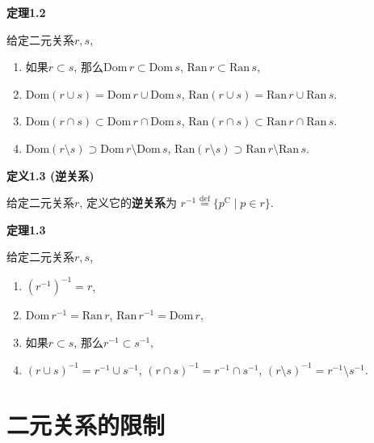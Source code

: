 \vspace{10pt}

\hypertarget{sec:定理1.2}{}
\noindent\textbf{定理1.2}

给定二元关系$r,s$,
\begin{enumerate}
    \item 如果$r\subset s$, 那么$\mathrm{Dom}\,r\subset\mathrm{Dom}\,s$,
    $\mathrm{Ran}\,r\subset\mathrm{Ran}\,s$,
    \item $\mathrm{Dom}(r\cup s)=\mathrm{Dom}\,r\cup\mathrm{Dom}\,s$,
    $\mathrm{Ran}(r\cup s)=\mathrm{Ran}\,r\cup\mathrm{Ran}\,s$.
    \item $\mathrm{Dom}(r\cap s)\subset\mathrm{Dom}\,r\cap\mathrm{Dom}\,s$,
    $\mathrm{Ran}(r\cap s)\subset\mathrm{Ran}\,r\cap\mathrm{Ran}\,s$.
    \item $\mathrm{Dom}(r\setminus s)\supset
    \mathrm{Dom}\,r\setminus\mathrm{Dom}\,s$,
    $\mathrm{Ran}(r\setminus s)\supset\mathrm{Ran}\,r\setminus\mathrm{Ran}\,s$.
\end{enumerate}

\vspace{10pt}

\hypertarget{sec:定义1.3}{}
\noindent\textbf{定义1.3 (逆关系)}

给定二元关系$r$, 定义它的\textbf{逆关系}为
$r^{-1}\overset{\mathrm{def}}{=}\{p^\mathrm{C}\mid p\in r\}$.

\vspace{10pt}

\hypertarget{sec:定理1.3}{}
\noindent\textbf{定理1.3}

给定二元关系$r,s$,
\begin{enumerate}
    \item $(r^{-1})^{-1}=r$,
    \item $\mathrm{Dom}\,r^{-1}=\mathrm{Ran}\,r$,
    $\mathrm{Ran}\,r^{-1}=\mathrm{Dom}\,r$,
    \item 如果$r\subset s$, 那么$r^{-1}\subset s^{-1}$,
    \item $(r\cup s)^{-1}=r^{-1}\cup s^{-1}$, $(r\cap s)^{-1}=r^{-1}\cap s^{-1}$,
    $(r\setminus s)^{-1}=r^{-1}\setminus s^{-1}$.
\end{enumerate}





\newpage

\section{二元关系的限制}

